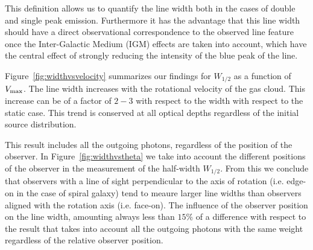 \documentclass[usenatbib]{mn2e}
\begin{document}
This definition allows us to quantify the line width both in the cases
of double and single peak emission. Furthermore it has the advantage
that this line width should have a direct observational correspondence
to the observed line feature once the Inter-Galactic Medium (IGM)
effects are taken into account, which have the central effect of
strongly reducing the intensity of the blue peak of the line.

Figure~\ref{fig:widthvsvelocity} summarizes our findings for $W_{1/2}$
as a function of $V_{\rm max}$. The line width increases with the
rotational velocity of the gas cloud. This increase can be of a factor
of $2-3$ with respect to the width with respect to the static
case. This trend is conserved at all optical depths regardless of the
initial source distribution. 

This result includes all the outgoing photons, regardless of the
position of the observer. In Figure~\ref{fig:widthvstheta} we
take into account the different positions of the observer in the
measurement of the half-width $W_{1/2}$. From this we conclude
that observers with a line of sight perpendicular to the axis of
rotation (i.e. edge-on in the case of spiral galaxy) tend to meaure
larger line widths than observers aligned with the rotation axis
(i.e. face-on). The influence of the observer position on the line
width, amounting always less than $15\%$ of a difference with respect
to the result that takes into account all the outgoing photons with
the same weight regardless of the relative observer position.


\end{document}
